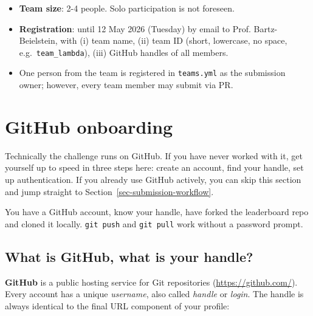 \documentclass[
  english,
  letterpaper,
]{scrbook}
\providecommand{\tightlist}{%
  \setlength{\itemsep}{0pt}\setlength{\parskip}{0pt}}
\begin{document}
\begin{itemize}
\tightlist
\item
  \textbf{Team size}: 2-4 people. Solo participation is not foreseen.
\item
  \textbf{Registration}: until 12 May 2026 (Tuesday) by email to Prof.
  Bartz-Beielstein, with (i) team name, (ii) team ID (short, lowercase,
  no space, e.g.~\texttt{team\_lambda}), (iii) GitHub handles of all
  members.
\item
  One person from the team is registered in \texttt{teams.yml} as the
  submission owner; however, every team member may submit via PR.
\end{itemize}

\section{GitHub onboarding}\label{sec-github-onboarding}

Technically the challenge runs on GitHub. If you have never worked with
it, get yourself up to speed in three steps here: create an account,
find your handle, set up authentication. If you already use GitHub
actively, you can skip this section and jump straight to
Section~\ref{sec-submission-workflow}.

\begin{tcolorbox}[enhanced jigsaw, arc=.35mm, bottomrule=.15mm, bottomtitle=1mm, breakable, colback=white, colbacktitle=quarto-callout-note-color!10!white, colframe=quarto-callout-note-color-frame, coltitle=black, left=2mm, leftrule=.75mm, opacityback=0, opacitybacktitle=0.6, rightrule=.15mm, title=\textcolor{quarto-callout-note-color}{\faInfo}\hspace{0.5em}{Learning objective}, titlerule=0mm, toprule=.15mm, toptitle=1mm]

You have a GitHub account, know your handle, have forked the leaderboard
repo and cloned it locally. \texttt{git\ push} and \texttt{git\ pull}
work without a password prompt.

\end{tcolorbox}

\subsection{What is GitHub, what is your
handle?}\label{what-is-github-what-is-your-handle}

\textbf{GitHub} is a public hosting service for Git repositories
(\url{https://github.com/}). Every account has a unique \emph{username},
also called \emph{handle} or \emph{login}. The handle is always
identical to the final URL component of your profile:
\end{document}
